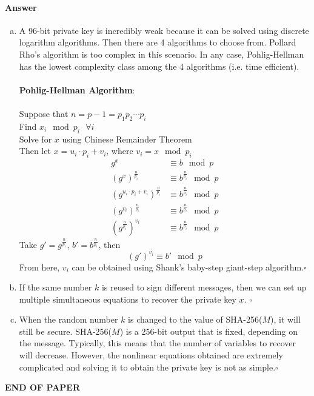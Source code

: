 \documentclass[12pt]{article}
\newcommand{\EOQ}{\hfill $\square$}
\begin{document}
\paragraph{Answer}
\begin{enumerate}[(a)]
\item A 96-bit private key is incredibly weak because it can be solved using discrete logarithm algorithms. Then there are 4 algorithms to choose from. Pollard Rho's algorithm is too complex in this scenario. In any case, Pohlig-Hellman has the lowest complexity class among the 4 algorithms (i.e. time efficient).\\\\
\textbf{Pohlig-Hellman Algorithm}:\\\\
Suppose that $n=p-1=p_1p_2\cdots p_i$\\
Find $x_i\mod p_i \text{~~}\forall i$\\
Solve for $x$ using Chinese Remainder Theorem\\
Then let $x=u_i\cdot p_i+v_i$, where $v_i=x\mod p_i$
\begin{equation*}
\begin{split}
g^x&\equiv b\mod p\\
(g^x)^{\frac{n}{p_i}}&\equiv b^{\frac{n}{p_i}}\mod p\\
(g^{u_i\cdot p_i+v_i})^{\frac{n}{p_i}}&\equiv b^{\frac{n}{p_i}}\mod p\\
(g^{v_i})^{\frac{n}{p_i}}&\equiv b^{\frac{n}{p_i}}\mod p\\
(g^\frac{n}{p_i})^{v_i}&\equiv b^{\frac{n}{p_i}}\mod p
\end{split}
\end{equation*}
Take $g'=g^{\frac{n}{p_i}}$, $b'=b^\frac{n}{p_i}$, then
\begin{equation*}
(g')^{v_i}\equiv b'\mod p
\end{equation*}
From here, $v_i$ can be obtained using Shank's baby-step giant-step algorithm.\EOQ
\item If the same number $k$ is reused to sign different messages, then we can set up multiple simultaneous equations to recover the private key $x$. \EOQ
\item When the random number $k$ is changed to the value of SHA-256($M$), it will still be secure. SHA-256($M$) is a 256-bit output that is fixed, depending on the message. Typically, this means that the number of variables to recover will decrease. However, the nonlinear equations obtained are extremely complicated and solving it to obtain the private key is not as simple.\EOQ
\end{enumerate}
\bigskip
\vfill
\begin{center}{\bf END OF PAPER}\end{center}
\end{document}
